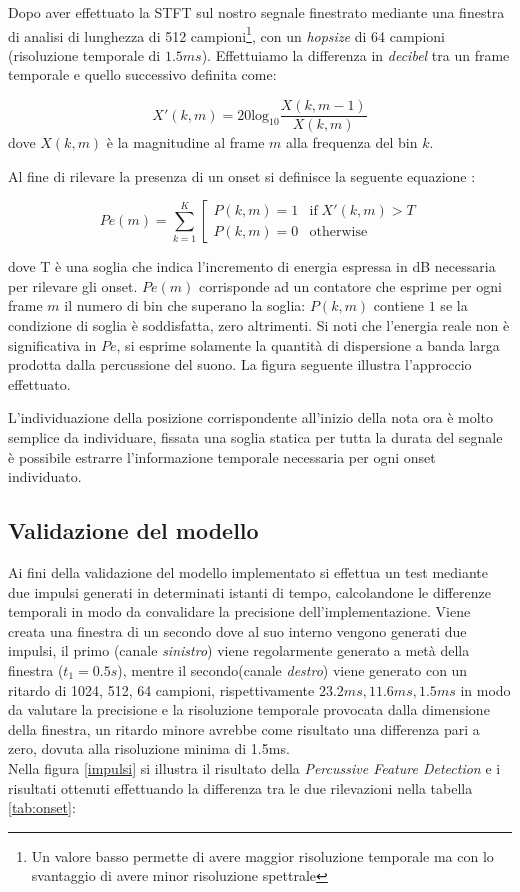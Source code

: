 \documentclass[12pt]{report}
\begin{document}
Dopo aver effettuato la STFT sul nostro segnale finestrato mediante una finestra di analisi di lunghezza di 512 campioni\footnote{Un valore basso permette di avere maggior risoluzione temporale ma con lo svantaggio di avere minor risoluzione spettrale}, con un {\itshape hopsize} di 64 campioni (risoluzione temporale di $1.5ms$). Effettuiamo la differenza in {\itshape decibel} tra un frame temporale e quello successivo\cite{pfd} definita come:

$$ X'(k,m) = 20\mbox{log}_{10}\frac{X(k,m-1)}{X(k,m)}$$
dove $X(k,m)$ è la magnitudine al frame $m$ alla frequenza del bin $k$.

Al fine di rilevare la presenza di un onset si definisce la seguente equazione :

$$ 
Pe(m) = \sum_{k = 1}^K \left[
\begin{array}{cc}
P(k,m) = 1 & \mbox{if} \; X'(k,m)>T \\
P(k,m) = 0 & \mbox{otherwise}
\end{array}
\right.
$$

dove T è una soglia che indica l'incremento di energia espressa in dB necessaria per rilevare gli onset. $Pe(m)$ corrisponde ad un contatore che esprime per ogni frame $m$ il numero di bin che superano la soglia: $P(k,m)$ contiene $1$ se la condizione di soglia è soddisfatta, zero altrimenti. Si noti che l'energia reale non è significativa in $Pe$, si esprime solamente la quantità di dispersione a banda larga prodotta dalla percussione del suono. La figura seguente illustra l'approccio effettuato.

L'individuazione della posizione corrispondente all'inizio della nota ora è molto semplice da individuare, fissata una soglia statica per tutta la durata del segnale è possibile estrarre l'informazione temporale necessaria per ogni onset individuato.

	\subsection{Validazione del modello}
	\label{cap3sec4_1}
		Ai fini della validazione del modello implementato si effettua un test mediante due impulsi generati in determinati istanti di tempo, calcolandone le differenze temporali in modo da convalidare la precisione dell'implementazione.
Viene creata una finestra di un secondo dove al suo interno vengono generati due impulsi, il primo (canale {\itshape sinistro}) viene regolarmente generato a metà della finestra ($t_1 = 0.5s$), mentre il secondo(canale {\itshape destro}) viene generato con un ritardo di 1024, 512, 64 campioni, rispettivamente $23.2ms, 11.6ms, 1.5ms$ in modo da valutare la precisione e la risoluzione temporale provocata dalla dimensione della finestra, un ritardo minore avrebbe come risultato una differenza pari a zero, dovuta alla risoluzione minima di 1.5ms.\\
Nella figura \ref{impulsi} si illustra il risultato della {\itshape Percussive Feature Detection} e i risultati ottenuti effettuando la differenza tra le due rilevazioni nella tabella \ref{tab:onset}:
	
\end{document}
